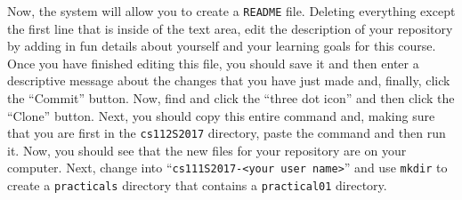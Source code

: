 Now, the system will allow you to create a {\tt README} file. Deleting everything except the first line that is inside
of the text area, edit the description of your repository by adding in fun details about yourself and your learning
goals for this course. Once you have finished editing this file, you should save it and then enter a descriptive message
about the changes that you have just made and, finally, click the ``Commit'' button. Now, find and click the ``three dot
icon'' and then click the ``Clone'' button. Next, you should copy this entire command and, making sure that you are
first in the {\tt cs112S2017} directory, paste the command and then run it. Now, you should see that the new files for
your repository are on your computer. Next, change into ``{\tt cs111S2017-<your user name>}'' and use {\tt mkdir} to
create a {\tt practicals} directory that contains a {\tt practical01} directory.




